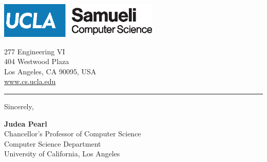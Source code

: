 \documentclass[12pt, a4paper, hidelinks]{letter} %
\begin{document}
\begin{minipage}{0.6\textwidth}
\vspace{-17mm}
\includegraphics[width=3in]{asset/UCLA_CS.eps}\\
\end{minipage}
\hfill
\begin{minipage}{0.3\textwidth}\raggedright
\vspace{-20mm}
\footnotesize{
277 Engineering VI\\
404 Westwood Plaza\\
Los Angeles, CA 90095, USA \\
\url{www.cs.ucla.edu}}
\end{minipage}
\hrule
\vspace{3mm}
\rightline{\today}






\vspace{+2mm}
Sincerely,

\vspace{+2mm}
\vspace{+2mm}
\vspace{+2mm}



\textbf{Judea Pearl}\\
Chancellor's Professor of Computer Science\\
Computer Science Department \\
University of California, Los Angeles
\end{document}
